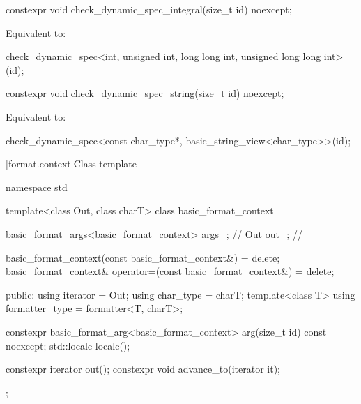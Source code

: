 %
\begin{itemdecl}
constexpr void check_dynamic_spec_integral(size_t id) noexcept;
\end{itemdecl}

\begin{itemdescr}
\pnum
\effects
Equivalent to:
\begin{codeblock}
check_dynamic_spec<int, unsigned int, long long int, unsigned long long int>(id);
\end{codeblock}
\end{itemdescr}

%
\begin{itemdecl}
constexpr void check_dynamic_spec_string(size_t id) noexcept;
\end{itemdecl}

\begin{itemdescr}
\pnum
\effects
Equivalent to:
\begin{codeblock}
check_dynamic_spec<const char_type*, basic_string_view<char_type>>(id);
\end{codeblock}
\end{itemdescr}

[format.context]{Class template }

%
%
%
%
\begin{codeblock}
namespace std {
  template<class Out, class charT>
  class basic_format_context {
    basic_format_args<basic_format_context> args_;      // \expos
    Out out_;                                           // \expos

    basic_format_context(const basic_format_context&) = delete;
    basic_format_context& operator=(const basic_format_context&) = delete;

  public:
    using iterator = Out;
    using char_type = charT;
    template<class T> using formatter_type = formatter<T, charT>;

    constexpr basic_format_arg<basic_format_context> arg(size_t id) const noexcept;
    std::locale locale();

    constexpr iterator out();
    constexpr void advance_to(iterator it);
  };
}
\end{codeblock}


